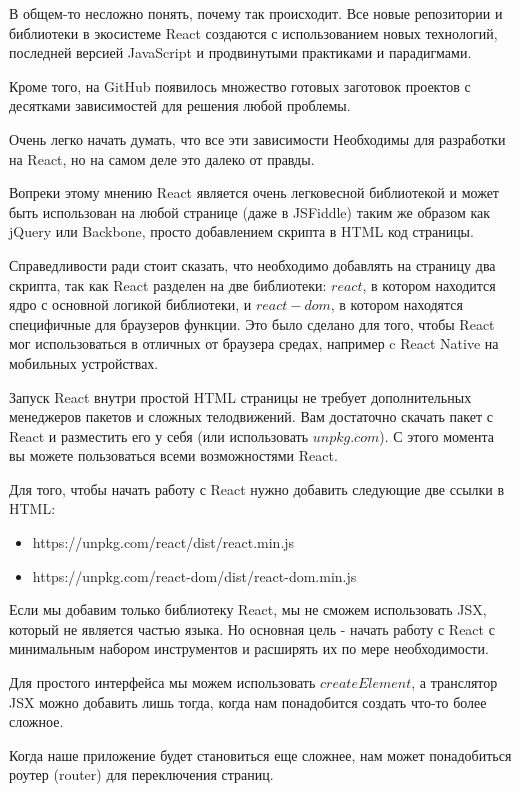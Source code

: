 В общем-то несложно понять, почему так происходит. Все новые репозитории и библиотеки в экосистеме React создаются с использованием новых технологий, последней версией JavaScript и продвинутыми практиками и парадигмами.

Кроме того, на GitHub появилось множество готовых заготовок проектов с десятками зависимостей для решения любой проблемы.

Очень легко начать думать, что все эти зависимости Необходимы для разработки на React, но на самом деле это далеко от правды.

Вопреки этому мнению React является очень легковесной библиотекой и может быть использован на любой странице (даже в JSFiddle) таким же образом как jQuery или Backbone, просто добавлением скрипта в HTML код страницы.

Справедливости ради стоит сказать, что необходимо добавлять на страницу два скрипта, так как React разделен на две библиотеки: $react$, в котором находится ядро с основной логикой библиотеки, и $react-dom$, в котором находятся специфичные для браузеров функции. Это было сделано для того, чтобы React мог использоваться в отличных от браузера средах, например c React Native на мобильных устройствах.

Запуск React внутри простой HTML страницы не требует дополнительных менеджеров пакетов и сложных телодвижений. Вам достаточно скачать пакет с React и разместить его у себя (или использовать $unpkg.com$). С этого момента вы можете пользоваться всеми возможностями React.

Для того, чтобы начать работу с React нужно добавить следующие две ссылки в HTML:

\begin{itemize}
  \item https://unpkg.com/react/dist/react.min.js
  \item https://unpkg.com/react-dom/dist/react-dom.min.js
\end{itemize}

Если мы добавим только библиотеку React, мы не сможем использовать JSX, который не является частью языка. Но основная цель - начать работу с React с минимальным набором инструментов и расширять их по мере необходимости.

Для простого интерфейса мы можем использовать $createElement$, а транслятор JSX можно добавить лишь тогда, когда нам понадобится создать что-то более сложное.

Когда наше приложение будет становиться еще сложнее, нам может понадобиться роутер (router) для переключения страниц.

